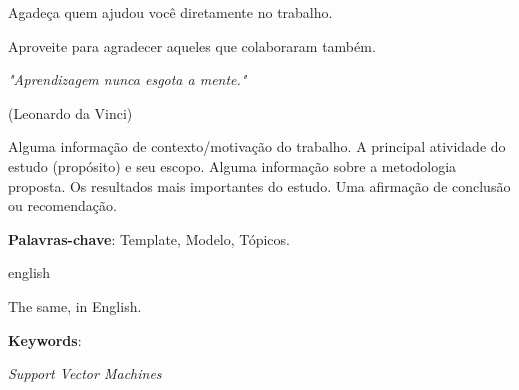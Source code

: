 \documentclass[
	12pt,				%
	openright,			%
	oneside,			%
	a4paper,			%
	english,			%
	french,				%
	spanish,			%
	brazil				%
	]{abntex2}
\begin{document}
\begin{agradecimentos}
Agadeça quem ajudou você diretamente no trabalho.

Aproveite para agradecer aqueles que colaboraram também.
\end{agradecimentos}

\newpage
\begin{epigrafe}
   \vspace*{\fill}
	\begin{flushright}
		\textit{"Aprendizagem nunca esgota a mente."}

    (Leonardo da Vinci)
	\end{flushright}
\end{epigrafe}


\setlength{\absparsep}{18pt} %
\begin{resumo}

Alguma informação de contexto/motivação do trabalho. A principal atividade do estudo (propósito) e seu escopo. Alguma informação sobre a metodologia proposta. Os resultados mais importantes do estudo. Uma afirmação de conclusão ou recomendação.

\textbf{Palavras-chave}: Template, Modelo, Tópicos.
\end{resumo}

\begin{resumo}[Abstract]
\begin{otherlanguage*}{english}

The same, in English.
 
\textbf{Keywords}:
\end{otherlanguage*}
\end{resumo}

\cleardoublepage

\listoffigures*
\cleardoublepage

\listoftables*
\cleardoublepage

\begin{siglas}

    \item[SVM] \textit{Support Vector Machines}

\end{siglas}


\tableofcontents*
\cleardoublepage

\textual










\postextual


\end{document}
